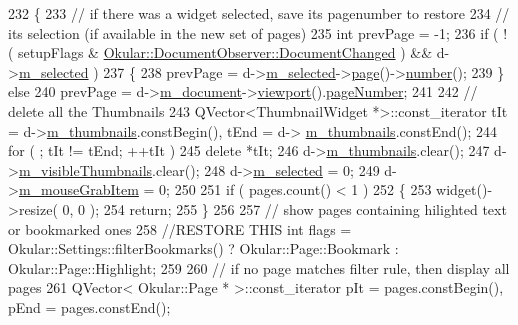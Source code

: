 \begin{DoxyCode}
232 \{
233     \textcolor{comment}{// if there was a widget selected, save its pagenumber to restore}
234     \textcolor{comment}{// its selection (if available in the new set of pages)}
235     \textcolor{keywordtype}{int} prevPage = -1;
236     \textcolor{keywordflow}{if} ( !( setupFlags & \hyperlink{classOkular_1_1DocumentObserver_aba00584af99894f95a9650e91f109d40ae599564392c01b22e96eff7602c4dd03}{Okular::DocumentObserver::DocumentChanged}
       ) && d->\hyperlink{classThumbnailListPrivate_a0b16f6278cb8bd930d7b484affe31bac}{m\_selected} )
237     \{
238         prevPage = d->\hyperlink{classThumbnailListPrivate_a0b16f6278cb8bd930d7b484affe31bac}{m\_selected}->\hyperlink{classThumbnailWidget_a3b39edbf5519ac9c804aacb79e623d5d}{page}()->\hyperlink{classOkular_1_1Page_a6eee5f157a130b47d81ddd63e501664b}{number}();
239     \} \textcolor{keywordflow}{else} 
240         prevPage = d->\hyperlink{classThumbnailListPrivate_ae19b3e09f87437e8d485d0e039a52b08}{m\_document}->\hyperlink{classOkular_1_1Document_abb8738de0a53aa4a9f552de0e1e749f8}{viewport}().\hyperlink{classOkular_1_1DocumentViewport_a122674d4a493e79b1aa5fd5c00e81c93}{pageNumber};
241 
242     \textcolor{comment}{// delete all the Thumbnails}
243     QVector<ThumbnailWidget *>::const\_iterator tIt = d->\hyperlink{classThumbnailListPrivate_adc3638d1cfe0435440c400065ccd20af}{m\_thumbnails}.constBegin(), tEnd = d->
      \hyperlink{classThumbnailListPrivate_adc3638d1cfe0435440c400065ccd20af}{m\_thumbnails}.constEnd();
244     \textcolor{keywordflow}{for} ( ; tIt != tEnd; ++tIt )
245         \textcolor{keyword}{delete} *tIt;
246     d->\hyperlink{classThumbnailListPrivate_adc3638d1cfe0435440c400065ccd20af}{m\_thumbnails}.clear();
247     d->\hyperlink{classThumbnailListPrivate_a7cbd0afea7a3fc032f23a1854cd7df52}{m\_visibleThumbnails}.clear();
248     d->\hyperlink{classThumbnailListPrivate_a0b16f6278cb8bd930d7b484affe31bac}{m\_selected} = 0;
249     d->\hyperlink{classThumbnailListPrivate_afd4652d135d2e87a4e10774e9cd73694}{m\_mouseGrabItem} = 0;
250 
251     \textcolor{keywordflow}{if} ( pages.count() < 1 )
252     \{
253         widget()->resize( 0, 0 );
254         \textcolor{keywordflow}{return};
255     \}
256 
257     \textcolor{comment}{// show pages containing hilighted text or bookmarked ones}
258     \textcolor{comment}{//RESTORE THIS int flags = Okular::Settings::filterBookmarks() ? Okular::Page::Bookmark :
       Okular::Page::Highlight;}
259 
260     \textcolor{comment}{// if no page matches filter rule, then display all pages}
261     QVector< Okular::Page * >::const\_iterator pIt = pages.constBegin(), pEnd = pages.constEnd();

\end{DoxyCode}
